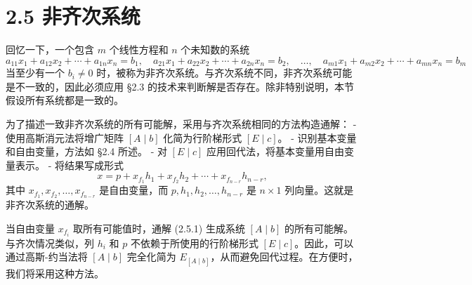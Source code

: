 \newcommand{\circlednum}[1]{%
    \tikz[baseline=(char.base)]{%
        \node[draw, circle, inner sep=1pt] (char) {#1};%
    }%
}

\section*{2.5 非齐次系统}
回忆一下，一个包含 \(m\) 个线性方程和 \(n\) 个未知数的系统
\[
a_{11}x_{1} + a_{12}x_{2} + \cdots + a_{1n}x_{n} = b_{1}, \quad
a_{21}x_{1} + a_{22}x_{2} + \cdots + a_{2n}x_{n} = b_{2}, \quad \ldots, \quad
a_{m1}x_{1} + a_{m2}x_{2} + \cdots + a_{mn}x_{n} = b_{m}
\]
当至少有一个 \(b_{i} \neq 0\) 时，被称为非齐次系统。与齐次系统不同，非齐次系统可能是不一致的，因此必须应用 §2.3 的技术来判断解是否存在。除非特别说明，本节假设所有系统都是一致的。

为了描述一致非齐次系统的所有可能解，采用与齐次系统相同的方法构造通解：
- 使用高斯消元法将增广矩阵 \([A \mid b]\) 化简为行阶梯形式 \([E \mid c]\)。
- 识别基本变量和自由变量，方法如 §2.4 所述。
- 对 \([E \mid c]\) 应用回代法，将基本变量用自由变量表示。
- 将结果写成形式
  \[
  x = p + x_{f_{1}} h_{1} + x_{f_{2}} h_{2} + \cdots + x_{f_{n-r}} h_{n-r},
  \]
  其中 \(x_{f_{1}}, x_{f_{2}}, \ldots, x_{f_{n-r}}\) 是自由变量，而 \(p, h_{1}, h_{2}, \ldots, h_{n-r}\) 是 \(n \times 1\) 列向量。这就是非齐次系统的通解。

当自由变量 \(x_{f_{i}}\) 取所有可能值时，通解 (2.5.1) 生成系统 \([A \mid b]\) 的所有可能解。与齐次情况类似，列 \(h_{i}\) 和 \(p\) 不依赖于所使用的行阶梯形式 \([E \mid c]\)。因此，可以通过高斯-约当法将 \([A \mid b]\) 完全化简为 \(E_{[A \mid b]}\)，从而避免回代过程。在方便时，我们将采用这种方法。

